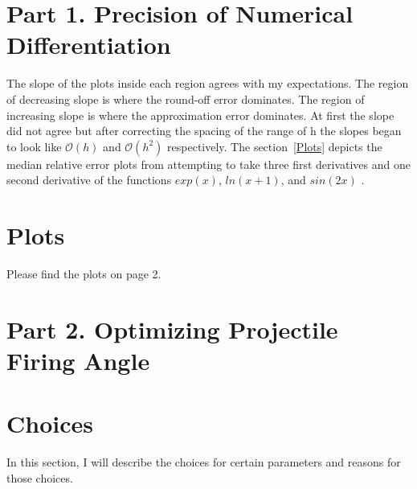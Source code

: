 \documentclass[12pt]{article}
\begin{document}
\maketitle

\section{Part 1. Precision of Numerical Differentiation}
The slope of the plots inside each region agrees with my expectations. The region of decreasing slope is where the round-off error dominates. The region of increasing slope is where the approximation error dominates. At first the slope did not agree but after correcting the spacing of the range of h the slopes began to look like $\mathcal{O}(h)$ and $\mathcal{O}(h^2)$ respectively. The section~\ref{Plots} depicts the median relative error plots from attempting to take three first derivatives and one second derivative of the functions $exp(x)$, $ln(x+1)$, and $sin(2x)$ .

\section{Plots}\label{plots}
Please find the plots on page 2. \\

\section{Part 2. Optimizing Projectile Firing Angle}

\section{Choices}\label{choices}
In this section, I will describe the choices for certain parameters and reasons for those choices.
\end{document}
